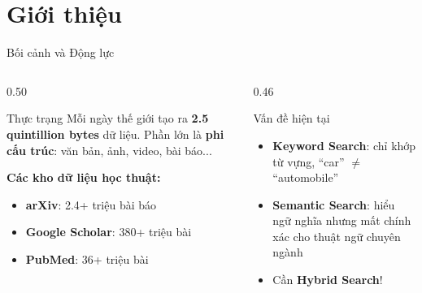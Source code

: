 \section{Giới thiệu}

\begin{frame}{Bối cảnh và Động lực}
\begin{columns}[T]
\begin{column}{0.50\textwidth}

\begin{alertblock}{Thực trạng}
{\footnotesize Mỗi ngày thế giới tạo ra \textbf{2.5 quintillion bytes} dữ liệu. Phần lớn là \textbf{phi cấu trúc}: văn bản, ảnh, video, bài báo...}
\end{alertblock}

\vspace{0.05cm}

{\footnotesize \textbf{Các kho dữ liệu học thuật:}}
\begin{itemize}\itemsep0pt \parskip0pt 
    \item \textcolor{accentBlue}{\textbf{arXiv}}: 2.4+ triệu bài báo
    \item \textcolor{accentOrange}{\textbf{Google Scholar}}: 380+ triệu bài
    \item \textcolor{accentPurple}{\textbf{PubMed}}: 36+ triệu bài
\end{itemize}

\end{column}
\begin{column}{0.46\textwidth}

\begin{exampleblock}{Vấn đề hiện tại}
{\footnotesize
\begin{itemize}\itemsep0pt \parskip0pt 
    \item \textbf{Keyword Search}: chỉ khớp từ vựng, ``car'' $\neq$ ``automobile''
    \item \textbf{Semantic Search}: hiểu ngữ nghĩa nhưng mất chính xác cho thuật ngữ chuyên ngành
    \item[$\Rightarrow$] Cần \textcolor{accentTeal}{\textbf{Hybrid Search}}!
\end{itemize}
}
\end{exampleblock}

\vspace{0.05cm}


\end{column}
\end{columns}
\end{frame}

